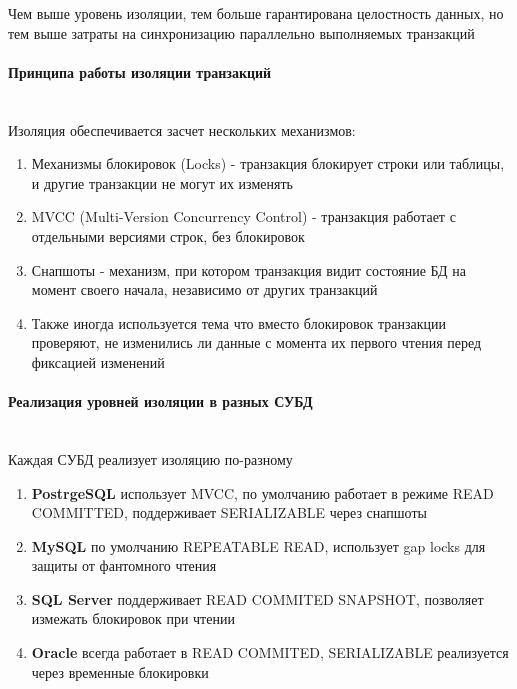  Чем выше уровень изоляции, тем больше гарантирована целостность данных, но тем выше затраты на синхронизацию параллельно выполняемых транзакций

\paragraph{Принципа работы изоляции транзакций} ~\\

Изоляция обеспечивается засчет нескольких механизмов:
\begin{enumerate}
    \item Механизмы блокировок (Locks) - транзакция блокирует строки или таблицы, и другие транзакции не могут их изменять
    \item MVCC (Multi-Version Concurrency Control) - транзакция работает с отдельными версиями строк, без блокировок
    \item Снапшоты - механизм, при котором транзакция видит состояние БД на момент своего начала, независимо от других транзакций
    \item Также иногда используется тема что вместо блокировок транзакции проверяют, не изменились ли данные с момента их первого чтения перед фиксацией изменений
\end{enumerate}

\paragraph{Реализация уровней изоляции в разных СУБД} ~\\

Каждая СУБД реализует изоляцию по-разному \autocites[§2]{PostgreSQLdocc13}[c. 17 §7.2.1]{Mysqldoc4}{MicrosoftLearnSQLserverIsolation}{oracledbdoc5}

\begin{enumerate}
    \item \textbf{PostrgeSQL} использует MVCC, по умолчанию работает в режиме READ COMMITTED, поддерживает SERIALIZABLE через снапшоты
    \item \textbf{MySQL} по умолчанию REPEATABLE READ, использует gap locks для защиты от фантомного чтения
    \item \textbf{SQL Server} поддерживает READ COMMITED SNAPSHOT, позволяет измежать блокировок при чтении
    \item \textbf{Oracle} всегда работает в READ COMMITED, SERIALIZABLE реализуется через временные блокировки
\end{enumerate}

